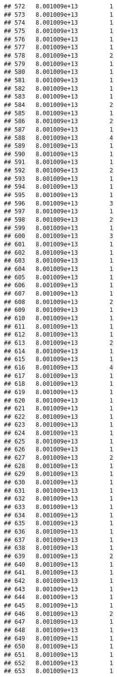 \documentclass[
]{article}
\begin{document}
\begin{verbatim}
## 572   8.001009e+13         1
## 573   8.001009e+13         1
## 574   8.001009e+13         1
## 575   8.001009e+13         1
## 576   8.001009e+13         1
## 577   8.001009e+13         1
## 578   8.001009e+13         2
## 579   8.001009e+13         1
## 580   8.001009e+13         1
## 581   8.001009e+13         1
## 582   8.001009e+13         1
## 583   8.001009e+13         1
## 584   8.001009e+13         2
## 585   8.001009e+13         1
## 586   8.001009e+13         2
## 587   8.001009e+13         1
## 588   8.001009e+13         4
## 589   8.001009e+13         1
## 590   8.001009e+13         1
## 591   8.001009e+13         1
## 592   8.001009e+13         2
## 593   8.001009e+13         1
## 594   8.001009e+13         1
## 595   8.001009e+13         1
## 596   8.001009e+13         3
## 597   8.001009e+13         1
## 598   8.001009e+13         2
## 599   8.001009e+13         1
## 600   8.001009e+13         3
## 601   8.001009e+13         1
## 602   8.001009e+13         1
## 603   8.001009e+13         1
## 604   8.001009e+13         1
## 605   8.001009e+13         1
## 606   8.001009e+13         1
## 607   8.001009e+13         1
## 608   8.001009e+13         2
## 609   8.001009e+13         1
## 610   8.001009e+13         1
## 611   8.001009e+13         1
## 612   8.001009e+13         1
## 613   8.001009e+13         2
## 614   8.001009e+13         1
## 615   8.001009e+13         1
## 616   8.001009e+13         4
## 617   8.001009e+13         1
## 618   8.001009e+13         1
## 619   8.001009e+13         1
## 620   8.001009e+13         1
## 621   8.001009e+13         1
## 622   8.001009e+13         1
## 623   8.001009e+13         1
## 624   8.001009e+13         1
## 625   8.001009e+13         1
## 626   8.001009e+13         1
## 627   8.001009e+13         2
## 628   8.001009e+13         1
## 629   8.001009e+13         1
## 630   8.001009e+13         1
## 631   8.001009e+13         1
## 632   8.001009e+13         1
## 633   8.001009e+13         1
## 634   8.001009e+13         1
## 635   8.001009e+13         1
## 636   8.001009e+13         1
## 637   8.001009e+13         1
## 638   8.001009e+13         1
## 639   8.001009e+13         2
## 640   8.001009e+13         1
## 641   8.001009e+13         1
## 642   8.001009e+13         1
## 643   8.001009e+13         1
## 644   8.001009e+13         1
## 645   8.001009e+13         1
## 646   8.001009e+13         2
## 647   8.001009e+13         1
## 648   8.001009e+13         1
## 649   8.001009e+13         1
## 650   8.001009e+13         1
## 651   8.001009e+13         1
## 652   8.001009e+13         1
## 653   8.001009e+13         1

\end{verbatim}
\end{document}
